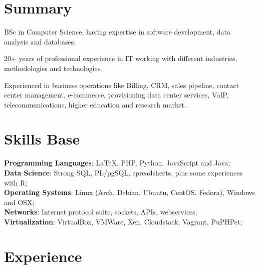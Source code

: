 \documentclass[margin]{res}
\begin{document}
  
\address{London, UK \\ 
         andre.reis@gmail.com \\ 
         Phone: +44 074 8210 1626 \\
         Linkedin: linkedin.com/in/andreleitereis \\
         Github: github.com/reis}

\begin{resume}
\section{Summary} BSc in Computer Science, having expertise in software development, 
                  data analysis and databases.
                        
                  20+ years of professional experience in IT working with different industries, 
                  methodologies and technologies.
                  
                  Experienced in business operations like Billing, CRM, sales pipeline, 
                  contact center management, e-commerce, provisioning data center services, 
                  VoIP, telecommunications, higher education and research market.

\section{Skills Base}  
  \textbf{Programming Languages}: \LaTeX , PHP, Python, JavaScript and Java;\\
  \textbf{Data Science}: Strong SQL, PL/pgSQL, spreadsheets, plus some experiences with R;\\
  \textbf{Operating Systems}:  Linux (Arch, Debian, Ubuntu, CentOS, Fedora), Windows and OSX;\\
  \textbf{Networks}: Internet protocol suite, sockets, APIs, webservices; \\
  \textbf{Virtualization}: VirtualBox, VMWare, Xen, Cloudstack, Vagrant, PuPHPet;\\
                                  

\section{Experience}


\end{resume}
\end{document}

